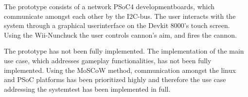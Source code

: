 \noindent The prototype consists of a network PSoC4 developmentboards, which communicate amongst each other by the I2C-bus. The user interacts with the system through a graphical userinterface on the Devkit 8000's touch screen. Using the Wii-Nunchuck the user controls cannon's aim, and fires the cannon. \newline

\noindent The prototype has not been fully implemented. The implementation of the main use case, which addresses gameplay functionalities, has not been fully implemented. Using the MoSCoW method, communication amongst the linux and PSoC platforms has been prioritized highly and therefore the use case addressing the systemtest has been implemented in full.\newline